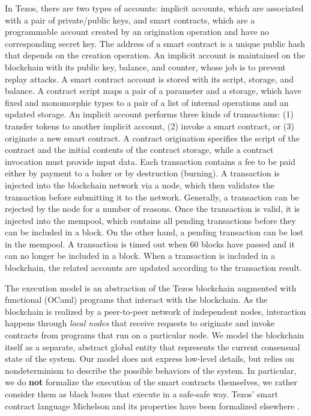 \documentclass[a4paper]{llncs}
\begin{document}
In Tezos, there are two types of accounts: implicit accounts, which are associated with a pair of private/public keys, and smart contracts, which are a programmable account created by an origination operation and have no corresponding secret key. The address of a smart contract is a unique public hash that depends on the creation operation. An implicit account is maintained on the blockchain with its public key, balance, and counter, whose job is to prevent replay attacks. A smart contract account is stored with its script, storage, and balance. A contract script maps a pair of a parameter and a storage, which have fixed and monomorphic types to a pair of a list of internal operations and an updated storage. An implicit account performs three kinds of transactions: (1) transfer tokens to another implicit account, (2) invoke a smart contract, or (3) originate a new smart contract. A contract origination specifies the script of the contract and the initial contents of the contract storage, while a contract invocation must provide input data. Each transaction contains a fee to be paid either by payment to a baker or by destruction (burning). A transaction is injected into the blockchain network via a node, which then validates the transaction before submitting it to the network. Generally, a transaction can be rejected by the node for a number of reasons. Once the transaction is valid, it is injected into the mempool, which contains all pending transactions before they can be included in a block. On the other hand, a pending transaction can be lost in the mempool. A transaction is timed out when 60 blocks have passed and it can no longer be included in a block. When a transaction is included in a blockchain, the related accounts are updated according to the transaction result. 


The execution model is an abstraction of the Tezos blockchain \cite{tezos-whitepaper}
augmented with functional (OCaml) programs that interact with the
blockchain. As the blockchain is realized by a peer-to-peer network of
independent nodes, interaction happens through
\emph{local nodes} that receive requests to originate and invoke
contracts from programs that run on a particular node. We model the blockchain
itself as a separate, abstract global entity that represents the
current consensual state of the system. Our model does not express
low-level details, but relies on nondeterminism to describe
the possible behaviors of the system. In particular, we do
\textbf{not} formalize the execution of the smart contracts
themselves, we rather consider them as black boxes that execute in a
safe-safe way. Tezos' smart contract language Michelson and its
properties have been formalized elsewhere \cite{DBLP:conf/fm/BernardoCHPT19}.
\end{document}
